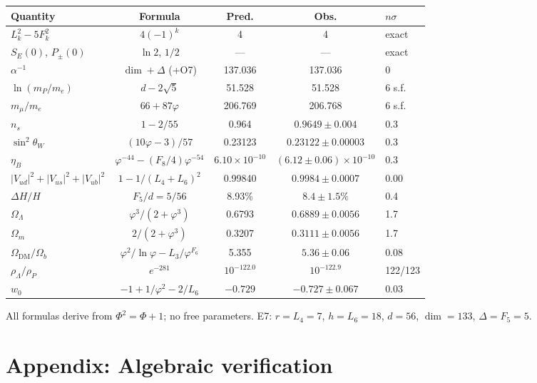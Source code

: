 \documentclass[12pt,a4paper]{article}
\begin{document}
\begin{center}
\scriptsize\setlength{\tabcolsep}{2pt}
\begin{tabular}{@{}lcccl@{}}
\toprule
\textbf{Quantity} & \textbf{Formula} & \textbf{Pred.} & \textbf{Obs.} & $n\sigma$ \\
\midrule
$L_k^2 - 5F_k^2$ & $4(-1)^k$ & 4 & 4 & exact \\
$S_E(0)$, $P_\pm(0)$ & $\ln 2$, $1/2$ & --- & --- & exact \\
$\alpha^{-1}$ & $\dim+\Delta$ (+O7) & 137.036 & 137.036 & 0 \\
$\ln(m_P/m_e)$ & $d-2\sqrt{5}$ & 51.528 & 51.528 & 6 s.f. \\
$m_\mu/m_e$ & $66+87\varphi$ & 206.769 & 206.768 & 6 s.f. \\
$n_s$ & $1-2/55$ & 0.964 & $0.9649\pm0.004$ & 0.3 \\
$\sin^2\theta_W$ & $(10\varphi-3)/57$ & 0.23123 & $0.23122\pm0.00003$ & 0.3 \\
$\eta_B$ & $\varphi^{-44}-(F_8/4)\varphi^{-54}$ & $6.10{\times}10^{-10}$ & $(6.12\pm0.06){\times}10^{-10}$ & 0.3 \\
$|V_{ud}|^2{+}|V_{us}|^2{+}|V_{ub}|^2$ & $1{-}1/(L_4{+}L_6)^2$ & 0.99840 & $0.9984\pm0.0007$ & 0.00 \\
$\Delta H/H$ & $F_5/d=5/56$ & 8.93\% & $8.4\pm1.5\%$ & 0.4 \\
$\Omega_\Lambda$ & $\varphi^3/(2{+}\varphi^3)$ & 0.6793 & $0.6889\pm0.0056$ & 1.7 \\
$\Omega_m$ & $2/(2{+}\varphi^3)$ & 0.3207 & $0.3111\pm0.0056$ & 1.7 \\
$\Omega_{\mathrm{DM}}/\Omega_b$ & $\varphi^2/\ln\varphi{-}L_3/\varphi^{F_6}$ & 5.355 & $5.36\pm0.06$ & 0.08 \\
$\rho_\Lambda/\rho_P$ & $e^{-281}$ & $10^{-122.0}$ & $10^{-122.9}$ & 122/123 \\
$w_0$ & $-1+1/\varphi^2-2/L_6$ & $-0.729$ & $-0.727\pm0.067$ & 0.03 \\
\bottomrule
\end{tabular}
\end{center}

\noindent All formulas derive from $\Phi^2 = \Phi + 1$; no free parameters. E7: $r=L_4=7$, $h=L_6=18$, $d=56$, $\dim=133$, $\Delta=F_5=5$.

\section*{Appendix: Algebraic verification}
\end{document}
